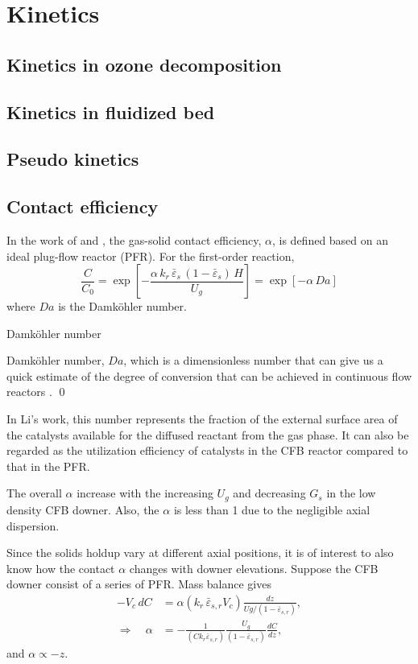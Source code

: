 \chapter{Kinetics}
\section{Kinetics in ozone decomposition}

\section{Kinetics in fluidized bed}

\section{Pseudo kinetics}

\section{Contact efficiency}
In the work of \citet{li2011catalytic} and \citet{li2013catalytic}, the gas-solid contact efficiency, $\alpha$, is defined based on an ideal plug-flow reactor (PFR). 
For the first-order reaction,
\begin{equation}
    \frac{C}{C_0} 
    = \exp\left[ 
        -\frac{\alpha\,k_r\,\bar{\varepsilon}_s\, (1-\bar{\varepsilon}_s)\,H}{U_g} 
        \right]
    = \exp\left[ -\alpha\,Da \right]
\end{equation}
where $Da$ is the Damköhler number.

\begin{definition}
    Damköhler number

    Damköhler number, $Da$, which is a dimensionless number that can give us a quick estimate of the degree of conversion that can be achieved in continuous flow reactors \citep{fogler2016element}.
    \qed
\end{definition}

In Li's work, this number represents the fraction of the external surface area of the catalysts available for the diffused reactant from the gas phase. 
It can also be regarded as the utilization efficiency of catalysts in the CFB reactor compared to that in the PFR.  

The overall $\alpha$ increase with the increasing $U_g$ and decreasing $G_s$ in the low density CFB downer. 
Also, the $\alpha$ is less than 1 due to the negligible axial dispersion.

Since the solids holdup vary at different axial positions, it is of interest to also know how the contact $\alpha$ changes with downer elevations. 
Suppose the CFB downer consist of a series of PFR. 
Mass balance gives
\begin{align}
    -V_c \, dC 
    &= \alpha(k_r\, \bar{\varepsilon}_{s,r} V_c) \frac{dz}{Ug/(1-\bar{\varepsilon}_{s,r})}, \\
    \Longrightarrow \quad
    \alpha &= -
    \frac{1}{(C k_r \bar{\varepsilon}_{s,r})} 
    \frac{U_g}{(1-\bar{\varepsilon}_{s,r})} 
    \frac{dC}{dz},
\end{align}
and $\alpha \propto - z$. 